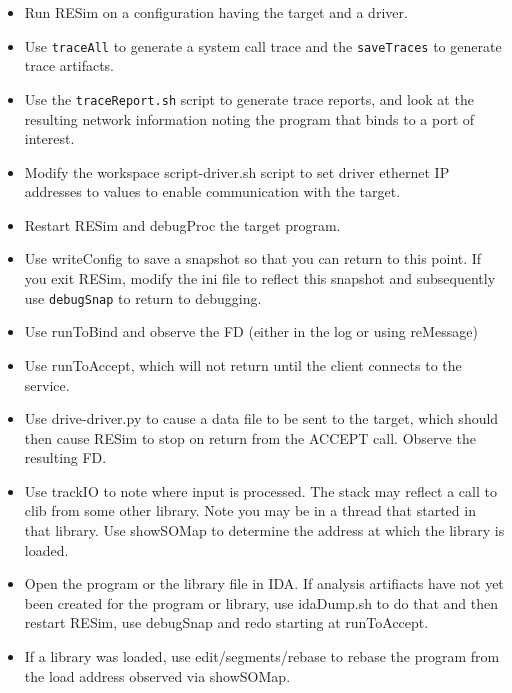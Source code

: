 \documentclass[titlepage]{article}
\begin{document}
\begin{itemize}
\item Run RESim on a configuration having the target and a driver.

\item Use {\tt traceAll} to generate a system call trace and the {\tt saveTraces} to generate
trace artifacts.

\item Use the {\tt traceReport.sh} script to generate trace reports,
and look at the resulting network information noting the
program that binds to a port of interest.

\item Modify the workspace script-driver.sh script to set
driver ethernet IP addresses to values to enable communication
with the target.

\item Restart RESim and debugProc the target program. 

\item Use writeConfig to save a snapshot so that you can return to this point.
If you exit RESim, modify the ini file to reflect this snapshot and subsequently
use {\tt debugSnap} to return to debugging.

\item Use runToBind and observe the FD (either in the log
or using reMessage)

\item Use runToAccept, which will not return until the client
connects to the service.  

\item Use drive-driver.py to cause a data file to be sent to the target, which 
should then cause RESim to stop on return from the ACCEPT call.  Observe the resulting FD.

\item Use trackIO to note where input is processed.  The stack
may reflect a call to clib from some other library.  Note
you may be in a thread that started in that library.  Use
showSOMap to determine the address at which
the library is loaded.

\item Open the program or the library file in IDA.  If analysis artifiacts have not yet
been created for the program or library, use idaDump.sh to do that and then restart RESim,
use debugSnap and redo starting at runToAccept. 

\item If a library was loaded, use edit/segments/rebase to rebase the program from the load address
observed via showSOMap.


\end{itemize}
\end{document}
